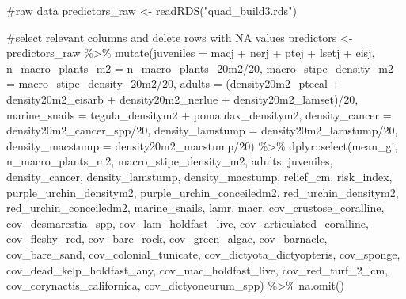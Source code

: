 \documentclass[
  letterpaper,
  DIV=11,
  numbers=noendperiod]{scrartcl}
\newenvironment{Shaded}{\begin{snugshade}}{\end{snugshade}}
\newcommand{\AttributeTok}[1]{\textcolor[rgb]{0.40,0.45,0.13}{#1}}
\newcommand{\CommentTok}[1]{\textcolor[rgb]{0.37,0.37,0.37}{#1}}
\newcommand{\DecValTok}[1]{\textcolor[rgb]{0.68,0.00,0.00}{#1}}
\newcommand{\FunctionTok}[1]{\textcolor[rgb]{0.28,0.35,0.67}{#1}}
\newcommand{\NormalTok}[1]{\textcolor[rgb]{0.00,0.23,0.31}{#1}}
\newcommand{\OtherTok}[1]{\textcolor[rgb]{0.00,0.23,0.31}{#1}}
\newcommand{\SpecialCharTok}[1]{\textcolor[rgb]{0.37,0.37,0.37}{#1}}
\newcommand{\StringTok}[1]{\textcolor[rgb]{0.13,0.47,0.30}{#1}}
\begin{document}
\begin{Shaded}
\begin{Highlighting}[]
\CommentTok{\#raw data}
\NormalTok{predictors\_raw }\OtherTok{\textless{}{-}} \FunctionTok{readRDS}\NormalTok{(}\StringTok{"quad\_build3.rds"}\NormalTok{) }

\CommentTok{\#select relevant columns and delete rows with NA values }
\NormalTok{predictors }\OtherTok{\textless{}{-}}\NormalTok{ predictors\_raw }\SpecialCharTok{\%\textgreater{}\%} 
   \FunctionTok{mutate}\NormalTok{(}\AttributeTok{juveniles =}\NormalTok{ macj }\SpecialCharTok{+}\NormalTok{ nerj }\SpecialCharTok{+}\NormalTok{ ptej }\SpecialCharTok{+}\NormalTok{ lsetj }\SpecialCharTok{+}\NormalTok{ eisj,}
         \AttributeTok{n\_macro\_plants\_m2 =}\NormalTok{ n\_macro\_plants\_20m2}\SpecialCharTok{/}\DecValTok{20}\NormalTok{,}
         \AttributeTok{macro\_stipe\_density\_m2 =}\NormalTok{ macro\_stipe\_density\_20m2}\SpecialCharTok{/}\DecValTok{20}\NormalTok{,}
         \AttributeTok{adults =}\NormalTok{ (density20m2\_ptecal }\SpecialCharTok{+}\NormalTok{ density20m2\_eisarb }\SpecialCharTok{+}\NormalTok{ density20m2\_nerlue }\SpecialCharTok{+}\NormalTok{ density20m2\_lamset)}\SpecialCharTok{/}\DecValTok{20}\NormalTok{,}
         \AttributeTok{marine\_snails =}\NormalTok{ tegula\_densitym2 }\SpecialCharTok{+}\NormalTok{ pomaulax\_densitym2,}
         \AttributeTok{density\_cancer =}\NormalTok{ density20m2\_cancer\_spp}\SpecialCharTok{/}\DecValTok{20}\NormalTok{,}
         \AttributeTok{density\_lamstump =}\NormalTok{ density20m2\_lamstump}\SpecialCharTok{/}\DecValTok{20}\NormalTok{,}
         \AttributeTok{density\_macstump =}\NormalTok{ density20m2\_macstump}\SpecialCharTok{/}\DecValTok{20}\NormalTok{) }\SpecialCharTok{\%\textgreater{}\%} 
\NormalTok{  dplyr}\SpecialCharTok{::}\FunctionTok{select}\NormalTok{(mean\_gi, n\_macro\_plants\_m2, macro\_stipe\_density\_m2, adults, juveniles, density\_cancer, density\_lamstump, density\_macstump, relief\_cm, risk\_index, purple\_urchin\_densitym2, purple\_urchin\_conceiledm2, red\_urchin\_densitym2, red\_urchin\_conceiledm2, marine\_snails, lamr, macr, cov\_crustose\_coralline, cov\_desmarestia\_spp, cov\_lam\_holdfast\_live, cov\_articulated\_coralline, cov\_fleshy\_red, cov\_bare\_rock, cov\_green\_algae, cov\_barnacle, cov\_bare\_sand, cov\_colonial\_tunicate, cov\_dictyota\_dictyopteris, cov\_sponge, cov\_dead\_kelp\_holdfast\_any, cov\_mac\_holdfast\_live, cov\_red\_turf\_2\_cm, cov\_corynactis\_californica, cov\_dictyoneurum\_spp) }\SpecialCharTok{\%\textgreater{}\%} 
  \FunctionTok{na.omit}\NormalTok{()}
\end{Highlighting}
\end{Shaded}
\end{document}
